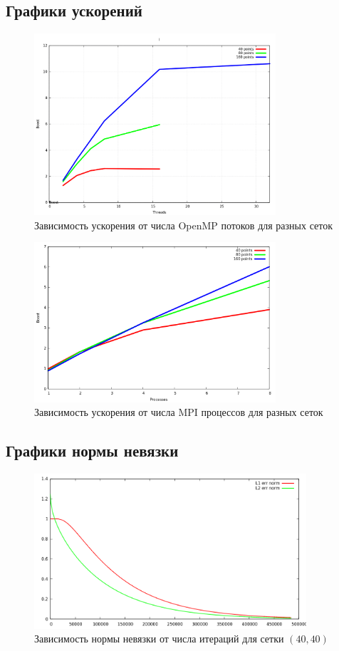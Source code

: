 \documentclass[oneside,final,14pt]{extreport}
\begin{document}
\newpage
\subsection{Графики ускорений}
\begin{figure}[ht!]
  \centering
  \includegraphics[width=0.8\textwidth]{picture5}
  \caption{Зависимость ускорения от числа OpenMP потоков для разных сеток}
\end{figure}
\begin{figure}[h!]
  \centering
  \includegraphics[width=0.8\textwidth]{picture10}
  \caption{Зависимость ускорения от числа MPI процессов для разных сеток}
\end{figure}

\newpage
\subsection{Графики нормы невязки}
\begin{figure}[ht!]
  \centering
  \includegraphics[width=0.9\textwidth]{picture6}
  \caption{Зависимость нормы невязки от числа итераций для сетки \((40, 40)\)}
\end{figure}
\end{document}

